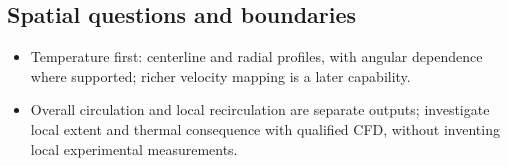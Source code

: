\subsection{Spatial questions and boundaries}\label{subsec:spatial-questions-and-boundaries}
\begin{itemize}[leftmargin=*]
\item Temperature first: centerline and radial profiles, with angular dependence where supported; richer velocity mapping is a later capability.
\item Overall circulation and local recirculation are separate outputs; investigate local extent and thermal consequence with qualified CFD, without inventing local experimental measurements.
\end{itemize}
